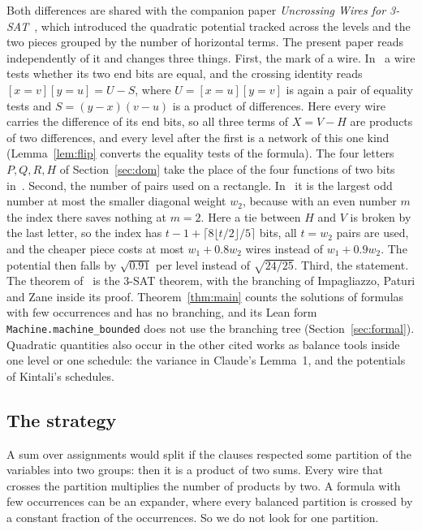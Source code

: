 \documentclass[11pt]{article}
\newcommand{\lean}[1]{\texttt{#1}}
\begin{document}
Both differences are shared with the companion paper \emph{Uncrossing Wires for 3-SAT}~\cite{Zhu26}, which introduced the quadratic potential tracked across the levels and the two pieces grouped by the number of horizontal terms. The present paper reads independently of it and changes three things. First, the mark of a wire. In~\cite{Zhu26} a wire tests whether its two end bits are equal, and the crossing identity reads $[x=v][y=u]=U-S$, where $U=[x=u][y=v]$ is again a pair of equality tests and $S=(y-x)(v-u)$ is a product of differences. Here every wire carries the difference of its end bits, so all three terms of $X=V-H$ are products of two differences, and every level after the first is a network of this one kind (Lemma~\ref{lem:flip} converts the equality tests of the formula). The four letters $P,Q,R,H$ of Section~\ref{sec:dom} take the place of the four functions of two bits in~\cite{Zhu26}. Second, the number of pairs used on a rectangle. In~\cite{Zhu26} it is the largest odd number at most the smaller diagonal weight $w_2$, because with an even number $m$ the index there saves nothing at $m=2$. Here a tie between $H$ and $V$ is broken by the last letter, so the index has $t-1+\lceil8\lfloor t/2\rfloor/5\rceil$ bits, all $t=w_2$ pairs are used, and the cheaper piece costs at most $w_1+0.8w_2$ wires instead of $w_1+0.9w_2$. The potential then falls by $\sqrt{0.91}$ per level instead of $\sqrt{24/25}$. Third, the statement. The theorem of~\cite{Zhu26} is the 3-SAT theorem, with the branching of Impagliazzo, Paturi and Zane inside its proof. Theorem~\ref{thm:main} counts the solutions of formulas with few occurrences and has no branching, and its Lean form \lean{Machine.machine\_bounded} does not use the branching tree (Section~\ref{sec:formal}). Quadratic quantities also occur in the other cited works as balance tools inside one level or one schedule: the variance in Claude's Lemma~1, and the potentials of Kintali's schedules.

\subsection*{The strategy}

A sum over assignments would split if the clauses respected some partition of the variables into two groups: then it is a product of two sums. Every wire that crosses the partition multiplies the number of products by two. A formula with few occurrences can be an expander, where every balanced partition is crossed by a constant fraction of the occurrences. So we do not look for one partition.
\end{document}
